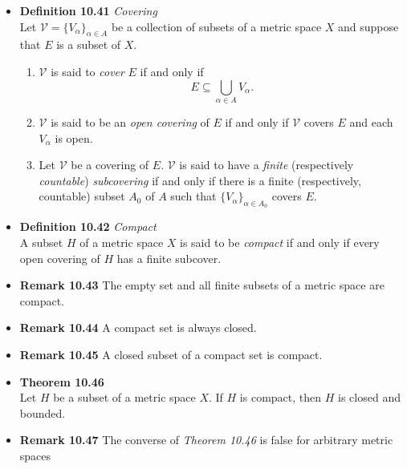 \documentclass[11pt,a4paper]{article}
\begin{document}
\begin{itemize}
    \item \textbf{Definition 10.41} \emph{Covering} \\
        Let $\mathcal{V} = {\{V_\alpha\}}_{\alpha \in A}$ be a collection of subsets of a
        metric space $X$ and suppose that $E$ is a subset of $X$.
        \begin{enumerate}
            \item $\mathcal{V}$ is said to \emph{cover} $E$ if and only if
                \[
                    E \subseteq \bigcup_{\alpha \in A} V_\alpha.
                \]

            \item $\mathcal{V}$ is said to be an \emph{open covering} of $E$ if and only if
                $\mathcal{V}$ covers $E$ and each $V_\alpha$ is open.
            \item Let $\mathcal{V}$ be a covering of $E$.
                $\mathcal{V}$ is said to have a \emph{finite} (respectively \emph{countable})
                \emph{subcovering} if and only if there is a finite (respectively, countable)
                subset $A_0$ of $A$ such that ${\{V_\alpha\}}_{\alpha \in A_0}$ covers $E$.
        \end{enumerate}

    \item \textbf{Definition 10.42} \emph{Compact} \\
        A subset $H$ of a metric space $X$ is said to be \emph{compact} if and only if every
        open covering of $H$ has a finite subcover.

    \item \textbf{Remark 10.43}
        The empty set and all finite subsets of a metric space are compact.

    \item \textbf{Remark 10.44}
        A compact set is always closed.

    \item \textbf{Remark 10.45}
        A closed subset of a compact set is compact.

    \item \textbf{Theorem 10.46} \\
        Let $H$ be a subset of a metric space $X$.
        If $H$ is compact, then $H$ is closed and bounded.

    \item \textbf{Remark 10.47}
        The converse of \emph{Theorem 10.46} is false for arbitrary metric spaces


\end{itemize}
\end{document}
